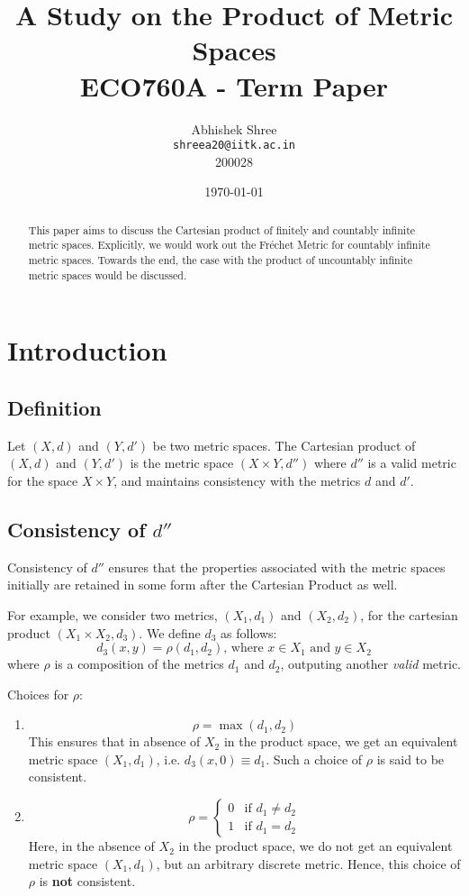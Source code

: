 \documentclass[12pt]{article}
\title{\vspace{80mm}\lightgreyb A Study on the Product of Metric Spaces \\
\lightgreyb ECO760A -  Term Paper}
\author{Abhishek Shree \\ \texttt{shreea20@iitk.ac.in} \\ 200028}
\date{\today}
\let\bold\textbf
\begin{document}
\clearpage\maketitle
\thispagestyle{empty}
\newpage
\setcounter{page}{1}

\renewcommand*{\abstractname}{\color{lightgrey}{Abstract}}

\begin{abstract}
    This paper aims to discuss the Cartesian product of finitely and countably infinite metric spaces. Explicitly, we would work out the Fréchet Metric for countably infinite metric spaces. Towards the end, the case with the product of uncountably infinite metric spaces would be discussed.
\end{abstract}

\section{Introduction}
\subsection{Definition}
Let $(X, d)$ and $(Y, d')$ be two metric spaces. The Cartesian product of $(X, d)$ and $(Y, d')$ is the metric space $(X \times Y, d'')$ where $d''$ is a valid metric for the space $X \times Y$, and maintains consistency with the metrics $d$ and $d'$.

\subsection{Consistency of $d''$}
Consistency of $d''$ ensures that the properties associated with the metric spaces initially are retained in some form after the Cartesian Product as well.

For example, we consider two metrics, $(X_1, d_1)$ and $(X_2, d_2)$, for the cartesian product $(X_1 \times X_2, d_3)$. 
We define $d_3$ as follows:
$$
d_3(x, y) = \rho(d_1, d_2) \text{, where } x \in X_1 \text{ and } y \in X_2
$$
where $\rho$ is a composition of the metrics $d_1$ and $d_2$, outputing another \emph{valid} metric.

Choices for $\rho$:
\begin{enumerate}
    \item $$\rho = \max(d_1, d_2)$$ 
    This ensures that in absence of $X_2$ in the product space, we get an equivalent metric space $(X_1, d_1)$, i.e. ${d_3(x, 0) \equiv d_1}$. Such a choice of $\rho$ is said to be consistent.
    \item $$\rho = \begin{cases}
        0 & \text{if } d_1 \ne d_2 \\
        1 & \text{if } d_1 = d_2
    \end{cases}$$ 
    Here, in the absence of $X_2$ in the product space, we do not get an equivalent metric space $(X_1, d_1)$, but an arbitrary discrete metric. Hence, this choice of $\rho$ is \bold{not} consistent. 
\end{enumerate}
\end{document}
